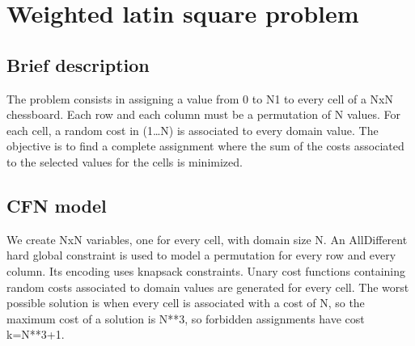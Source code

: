 \documentclass[letterpaper,10pt,openany,oneside,english]{sphinxmanual}
\begin{document}
\begin{sphinxVerbatim}[commandchars=\\\{\}]
    
 
	   
		  \PYG{p}{[}  \PYG{p}{[}\PYG{p}{]}\PYG{p}{[}\PYG{p}{]}      \PYG{p}{]}
	 \PYG{p}{[}\PYG{p}{]}

\end{sphinxVerbatim}

\sphinxstepscope


\section{Weighted latin square problem}
\label{\detokenize{examples/tuto_wlsp:weighted-latin-square-problem}}\label{\detokenize{examples/tuto_wlsp:tuto-wlsp}}\label{\detokenize{examples/tuto_wlsp::doc}}



\subsection{Brief description}
\label{\detokenize{examples/tuto_wlsp:brief-description}}
\sphinxAtStartPar
The problem consists in assigning a value from 0 to N\sphinxhyphen{}1 to every cell of a NxN chessboard.
Each row and each column must be a permutation of N values. For each cell, a random cost in (1…N) is associated to every domain value.
The objective is to find a complete assignment where the sum of the costs associated to the selected values for the cells is minimized.


\subsection{CFN model}
\label{\detokenize{examples/tuto_wlsp:cfn-model}}
\sphinxAtStartPar
We create NxN variables, one for every cell, with domain size N. An AllDifferent hard global constraint is used to model a permutation for every row and every column. Its encoding uses knapsack constraints.
Unary cost functions containing random costs associated to domain values are generated for every cell.
The worst possible solution is when every cell is associated with a cost of N, so the maximum cost of a solution is N**3, so forbidden assignments have cost k=N**3+1.
\end{document}
